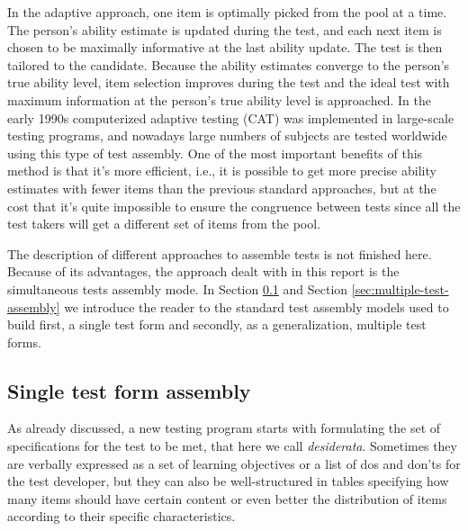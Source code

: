 In the adaptive approach, one item is optimally picked from the pool at a time. The person's ability estimate is updated during the test, and each next item is chosen to be maximally informative at the last ability update. The test is then tailored to the candidate. Because the ability estimates converge to the person's true ability level, item selection improves during the test and the ideal test with maximum information at the person's true ability level is approached. In the early 1990s computerized adaptive testing (CAT) was implemented in large-scale testing programs, and nowadays large numbers of subjects are tested worldwide using this type of test assembly. One of the most important benefits of this method is that it's more efficient, i.e., it is possible to get more precise ability estimates with fewer items than the previous standard approaches, but at the cost that it's quite impossible to ensure the congruence between tests since all the test takers will get a different set of items from the pool.

The description of different approaches to assemble tests is not finished here. Because of its advantages, the approach dealt with in this report is the simultaneous tests assembly mode.
In Section \ref{sec:single-test-assembly} and Section \ref{sec:multiple-test-assembly} we introduce the reader to the standard test assembly models used to build first, a single test form and secondly, as a generalization, multiple test forms.

\subsection{Single test form assembly}\label{sec:single-test-assembly}

As already discussed, a new testing program starts with formulating the set of specifications for the test to be met, that here we call \emph{desiderata}. Sometimes they are verbally expressed as a set of learning objectives or a list of dos and don'ts for the test developer, but they can also be well-structured in tables specifying how many items should have certain content or even better the distribution of items according to their specific characteristics.

